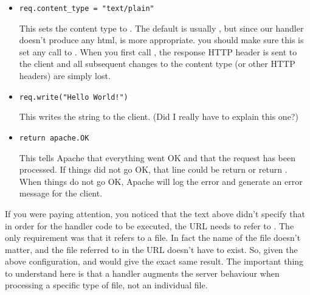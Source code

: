 \begin{enumerate}
\begin{itemize}
  \item
    \begin{verbatim}
req.content_type = "text/plain"
    \end{verbatim}

    This sets the content type to . The default is usually
    , but since our handler doesn't produce any html,
     is more appropriate.
     you should  make sure this is set
     any call to . When you first call
    , the response HTTP header is sent to the client and all
    subsequent changes to the content type (or other HTTP headers) are simply
    lost.

  \item
    \begin{verbatim}
req.write("Hello World!")
    \end{verbatim}

    This writes the  string to the client. (Did I really
    have to explain this one?)

  \item
    \begin{verbatim}
return apache.OK
    \end{verbatim}

    This tells Apache that everything went OK and that the request has
    been processed. If things did not go OK, that line could be return
     or return
    . When things do not go OK, Apache
    will log the error and generate an error message for the client.
  \end{itemize}
\end{enumerate}

 If you were paying attention, you
noticed that the text above didn't specify that in order for the
handler code to be executed, the URL needs to refer to
. The only requirement was that it refers to a
 file. In fact the name of the file doesn't matter, and
the file referred to in the URL doesn't have to exist. So, given the
above configuration,  and
 would give the exact
same result. The important thing to understand here is that a handler
augments the server behaviour when processing a specific type of file,
not an individual file.

